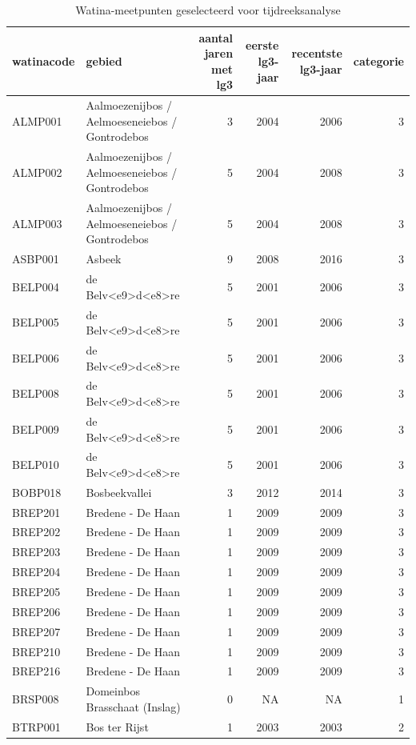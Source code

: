 \documentclass[11pt,]{book}
\begin{document}
\begin{table}

\caption{\label{tab:tubes-cat123}Watina-meetpunten geselecteerd voor tijdreeksanalyse}
\centering
\begin{tabular}[t]{l|l|r|r|r|r}
\hline
watinacode & gebied & aantal jaren met lg3 & eerste lg3-jaar & recentste lg3-jaar & categorie\\
\hline
ALMP001 & Aalmoezenijbos / Aelmoeseneiebos / Gontrodebos & 3 & 2004 & 2006 & 3\\
\hline
ALMP002 & Aalmoezenijbos / Aelmoeseneiebos / Gontrodebos & 5 & 2004 & 2008 & 3\\
\hline
ALMP003 & Aalmoezenijbos / Aelmoeseneiebos / Gontrodebos & 5 & 2004 & 2008 & 3\\
\hline
ASBP001 & Asbeek & 9 & 2008 & 2016 & 3\\
\hline
BELP004 & de Belv<e9>d<e8>re & 5 & 2001 & 2006 & 3\\
\hline
BELP005 & de Belv<e9>d<e8>re & 5 & 2001 & 2006 & 3\\
\hline
BELP006 & de Belv<e9>d<e8>re & 5 & 2001 & 2006 & 3\\
\hline
BELP008 & de Belv<e9>d<e8>re & 5 & 2001 & 2006 & 3\\
\hline
BELP009 & de Belv<e9>d<e8>re & 5 & 2001 & 2006 & 3\\
\hline
BELP010 & de Belv<e9>d<e8>re & 5 & 2001 & 2006 & 3\\
\hline
BOBP018 & Bosbeekvallei & 3 & 2012 & 2014 & 3\\
\hline
BREP201 & Bredene - De Haan & 1 & 2009 & 2009 & 3\\
\hline
BREP202 & Bredene - De Haan & 1 & 2009 & 2009 & 3\\
\hline
BREP203 & Bredene - De Haan & 1 & 2009 & 2009 & 3\\
\hline
BREP204 & Bredene - De Haan & 1 & 2009 & 2009 & 3\\
\hline
BREP205 & Bredene - De Haan & 1 & 2009 & 2009 & 3\\
\hline
BREP206 & Bredene - De Haan & 1 & 2009 & 2009 & 3\\
\hline
BREP207 & Bredene - De Haan & 1 & 2009 & 2009 & 3\\
\hline
BREP210 & Bredene - De Haan & 1 & 2009 & 2009 & 3\\
\hline
BREP216 & Bredene - De Haan & 1 & 2009 & 2009 & 3\\
\hline
BRSP008 & Domeinbos Brasschaat (Inslag) & 0 & NA & NA & 1\\
\hline
BTRP001 & Bos ter Rijst & 1 & 2003 & 2003 & 2\\

\end{tabular}
\end{table}
\end{document}
